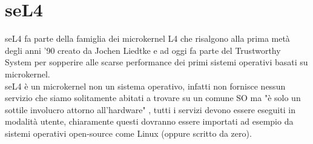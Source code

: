 \section{seL4}
seL4 fa parte della famiglia dei microkernel L4 che risalgono alla prima metà degli anni '90 creato da Jochen Liedtke e ad oggi fa parte del Trustworthy System per sopperire alle scarse performance dei primi sistemi operativi basati su microkernel.\\
seL4 è un microkernel non un sistema operativo, infatti non fornisce nessun servizio che siamo solitamente abitati a trovare su un comune SO ma "è solo un sottile involucro attorno all'hardware" \cite{sel4-whitepaper}, tutti i servizi devono essere eseguiti in modalità utente, chiaramente questi dovranno essere importati ad esempio da sistemi operativi open-source come Linux (oppure scritto da zero).